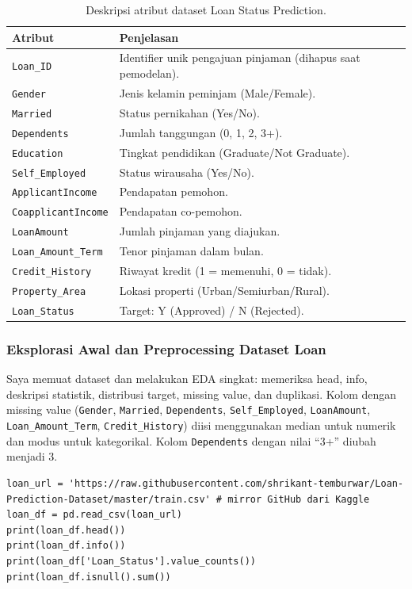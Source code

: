 \documentclass[a4paper,oneside,12pt]{report}
\begin{document}
\begin{table}[H]
\centering
\small
\begin{tabular}{|l|p{9cm}|}
\hline
\textbf{Atribut} & \textbf{Penjelasan} \\
\hline
\texttt{Loan\_ID} & Identifier unik pengajuan pinjaman (dihapus saat pemodelan). \\
\texttt{Gender} & Jenis kelamin peminjam (Male/Female). \\
\texttt{Married} & Status pernikahan (Yes/No). \\
\texttt{Dependents} & Jumlah tanggungan (0, 1, 2, 3+). \\
\texttt{Education} & Tingkat pendidikan (Graduate/Not Graduate). \\
\texttt{Self\_Employed} & Status wirausaha (Yes/No). \\
\texttt{ApplicantIncome} & Pendapatan pemohon. \\
\texttt{CoapplicantIncome} & Pendapatan co-pemohon. \\
\texttt{LoanAmount} & Jumlah pinjaman yang diajukan. \\
\texttt{Loan\_Amount\_Term} & Tenor pinjaman dalam bulan. \\
\texttt{Credit\_History} & Riwayat kredit (1 = memenuhi, 0 = tidak). \\
\texttt{Property\_Area} & Lokasi properti (Urban/Semiurban/Rural). \\
\texttt{Loan\_Status} & Target: Y (Approved) / N (Rejected). \\
\hline
\end{tabular}
\caption{Deskripsi atribut dataset Loan Status Prediction.}
\label{tab:loan-attributes}
\end{table}

\subsubsection{Eksplorasi Awal dan Preprocessing Dataset Loan}
Saya memuat dataset dan melakukan EDA singkat: memeriksa head, info, deskripsi statistik, distribusi target, missing value, dan duplikasi. Kolom dengan missing value (\texttt{Gender}, \texttt{Married}, \texttt{Dependents}, \texttt{Self\_Employed}, \texttt{LoanAmount}, \texttt{Loan\_Amount\_Term}, \texttt{Credit\_History}) diisi menggunakan median untuk numerik dan modus untuk kategorikal. Kolom \texttt{Dependents} dengan nilai ``3+'' diubah menjadi 3.

\begin{lstlisting}[style=pythonstyle,caption={Memuat dan memeriksa dataset Loan.}]
loan_url = 'https://raw.githubusercontent.com/shrikant-temburwar/Loan-Prediction-Dataset/master/train.csv' # mirror GitHub dari Kaggle
loan_df = pd.read_csv(loan_url)
print(loan_df.head())
print(loan_df.info())
print(loan_df['Loan_Status'].value_counts())
print(loan_df.isnull().sum())
\end{lstlisting}
\end{document}
